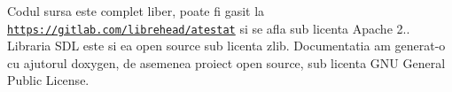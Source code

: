 Codul sursa este complet liber, poate fi gasit la \href{https://gitlab.com/librehead/atestat}{\tt https\+://gitlab.\+com/librehead/atestat} si se afla sub licenta Apache 2.. Libraria S\+DL este si ea open source sub licenta zlib. Documentatia am generat-\/o cu ajutorul doxygen, de asemenea proiect open source, sub licenta G\+NU General Public License. 